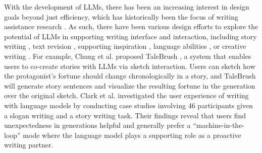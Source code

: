 With the development of LLMs, there has been an increasing interest in design goals beyond just efficiency, which has historically been the focus of writing assistance research \cite{jakesch2023co}. As such, there have been various design efforts to explore the potential of LLMs in supporting writing interface and interaction, including story writing \cite{singh2022hide}, text revision \cite{cui2020justcorrect, zhang2019type}, supporting inspiration \cite{inspiration1, lee2022coauthor, singh2022hide}, language abilities \cite{buschek2021impact}, or creative writing \cite{clark2018creative}. For example, Chung et al. proposed TaleBrush \cite{chung2022talebrush,chung2022talebrush_EA}, a system that enables users to co-create stories with LLMs via sketch interaction. Users can sketch how the protagonist's fortune should change chronologically in a story, and TaleBrush will generate story sentences and visualize the resulting fortune in the generation over the original sketch. Clark et al. \cite{clark2018creative} investigated the user experience of writing with language models by conducting case studies involving 46 participants given a slogan writing and a story writing task. Their findings reveal that users find unexpectedness in generations helpful and generally prefer a ``machine-in-the-loop'' mode where the language model plays a supporting role as a proactive writing partner.




